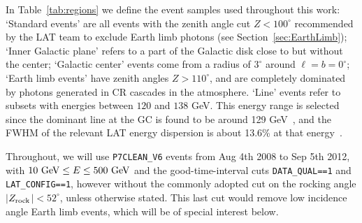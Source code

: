 \documentclass[aps,twocolumn,prd,superscriptaddress,showpacs,nofootinbib,fixfloat]{revtex4}
\newcommand{\GeV}{{\rm ~GeV}}
\newcommand{\zrock}{$Z_{\rm rock}$}
\begin{document}
In Table~\ref{tab:regions} we define the event samples
used throughout this work: `Standard events' are all
events with the zenith angle cut $Z<100^\circ$ recommended
by the LAT team to exclude Earth
limb photons (see Section~\ref{sec:EarthLimb}); `Inner
Galactic plane' refers to a part of the Galactic disk close
to but without the center; `Galactic center' events come from
a radius of $3^\circ$ around
$\ell=b=0^\circ$; `Earth limb events' have
zenith angles $Z>110^\circ$, and are completely
dominated by photons generated in CR cascades in the
atmosphere. `Line' events refer to subsets with energies
between $120$ and $138$ GeV. This energy range is selected
since the dominant line at the GC is found to be around 129
GeV~\cite{linepaper}, and the FWHM of the relevant LAT energy dispersion is about
13.6\% at that energy~\cite{Weniger:2012}.

Throughout, we will use \texttt{P7CLEAN\_V6} events from
Aug 4th 2008 to Sep 5th 2012, with $10\GeV\leq E\leq 500 \GeV$ and the good-time-interval cuts
\texttt{DATA\_QUAL==1} and \texttt{LAT\_CONFIG==1}, however
without the commonly adopted cut on the rocking angle
$|$\zrock$|<52^\circ$, unless otherwise stated. This last cut would remove
low incidence angle Earth limb events, which will be of special interest
below.
\medskip
\end{document}
